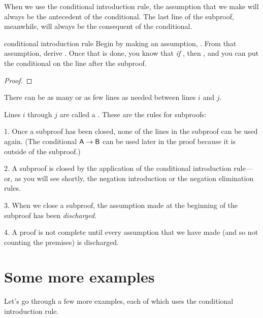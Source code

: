 When we use the conditional introduction rule, the assumption that we make will always be the antecedent of the conditional. The last line of the subproof, meanwhile, will always be the consequent of the conditional. 

\begin{factboxy}{conditional introduction rule}
\footnotesize{Begin by making an assumption, . From that assumption, derive . Once that is done, you know that \textit{if} , then , and you can put the conditional on the line after the subproof.} 
	\begin{proof}
		\open
			 \as{}
		\close
	\end{proof}
\footnotesize{There can be as many or as few lines as needed between lines $i$ and $j$.} 
\end{factboxy}

Lines $i$ through $j$ are called a . These are the rules for subproofs:

\begin{earg}
\item[1.] Once a subproof has been closed, none of the lines in the subproof can be used again. (The conditional $\mathsf{A}\rightarrow\mathsf{B}$ can be used later in the proof because it is outside of the subproof.)
\item[2.] A subproof is closed by the application of the conditional introduction rule---or, as you will see shortly, the negation introduction or the negation elimination rules.
\item[3.] When we close a subproof, the assumption made at the beginning of the subproof has been \textit{discharged}.
\item[4.] A proof is not complete until every assumption that we have made (and so not counting the premises) is discharged.
\end{earg}


\section{Some more examples}

Let's go through a few more examples, each of which uses the conditional introduction rule.

